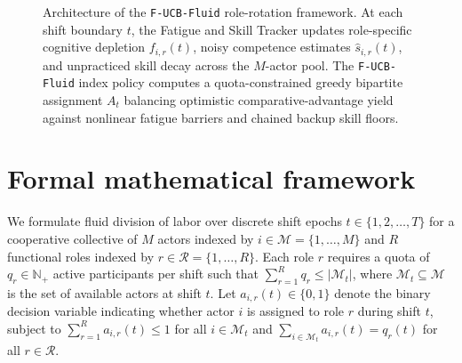 \documentclass[11pt]{article}
\begin{document}
\begin{figure}[ht]
{%
}
\caption{Architecture of the \texttt{F-UCB-Fluid} role-rotation framework. At each shift boundary $t$, the Fatigue and Skill Tracker updates role-specific cognitive depletion $f_{i,r}(t)$, noisy competence estimates $\hat{s}_{i,r}(t)$, and unpracticed skill decay across the $M$-actor pool. The \texttt{F-UCB-Fluid} index policy computes a quota-constrained greedy bipartite assignment $A_t$ balancing optimistic comparative-advantage yield against nonlinear fatigue barriers and chained backup skill floors.}
\label{fig:architecture}
\end{figure}

\section{Formal mathematical framework}\label{sec:formal}

We formulate fluid division of labor over discrete shift epochs $t \in \{1,\allowbreak 2,\allowbreak \dots,\allowbreak T\}$ for a cooperative collective of $M$ actors indexed by $i \in \mathcal{M} = \{1,\allowbreak \dots,\allowbreak M\}$ and $R$ functional roles indexed by $r \in \mathcal{R} = \{1,\allowbreak \dots,\allowbreak R\}$. Each role $r$ requires a quota of $q_r \in \mathbb{N}_+$ active participants per shift such that $\sum_{r=1}^R q_r \le |\mathcal{M}_t|$, where $\mathcal{M}_t \allowbreak \subseteq \mathcal{M}$ is the set of available actors at shift $t$. Let $a_{i,r}(t) \allowbreak \in \{0,\allowbreak 1\}$ denote the binary decision variable indicating whether actor $i$ is assigned to role $r$ during shift $t$, subject to $\sum_{r=1}^R a_{i,r}(t) \le 1$ for all $i \in \mathcal{M}_t$ and $\sum_{i \in \mathcal{M}_t} a_{i,r}(t) = q_r(t)$ for all $r \in \mathcal{R}$.
\end{document}
